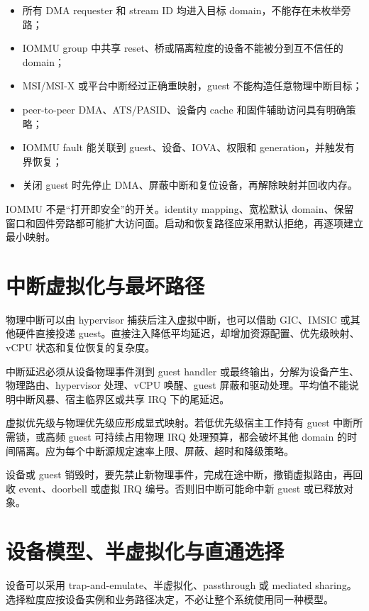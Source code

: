 \begin{itemize}
  \item 所有 DMA requester 和 stream ID 均进入目标 domain，不能存在未枚举旁路；
  \item IOMMU group 中共享 reset、桥或隔离粒度的设备不能被分到互不信任的 domain；
  \item MSI/MSI-X 或平台中断经过正确重映射，guest 不能构造任意物理中断目标；
  \item peer-to-peer DMA、ATS/PASID、设备内 cache 和固件辅助访问具有明确策略；
  \item IOMMU fault 能关联到 guest、设备、IOVA、权限和 generation，并触发有界恢复；
  \item 关闭 guest 时先停止 DMA、屏蔽中断和复位设备，再解除映射并回收内存。
\end{itemize}

IOMMU 不是“打开即安全”的开关。identity mapping、宽松默认 domain、保留窗口和固件旁路都可能扩大访问面。启动和恢复路径应采用默认拒绝，再逐项建立最小映射。

\section{中断虚拟化与最坏路径}

物理中断可以由 hypervisor 捕获后注入虚拟中断，也可以借助 GIC、IMSIC 或其他硬件直接投递 guest。直接注入降低平均延迟，却增加资源配置、优先级映射、vCPU 状态和复位恢复的复杂度。

中断延迟必须从设备物理事件测到 guest handler 或最终输出，分解为设备产生、物理路由、hypervisor 处理、vCPU 唤醒、guest 屏蔽和驱动处理。平均值不能说明中断风暴、宿主临界区或共享 IRQ 下的尾延迟。

虚拟优先级与物理优先级应形成显式映射。若低优先级宿主工作持有 guest 中断所需锁，或高频 guest 可持续占用物理 IRQ 处理预算，都会破坏其他 domain 的时间隔离。应为每个中断源规定速率上限、屏蔽、超时和降级策略。

设备或 guest 销毁时，要先禁止新物理事件，完成在途中断，撤销虚拟路由，再回收 event、doorbell 或虚拟 IRQ 编号。否则旧中断可能命中新 guest 或已释放对象。

\section{设备模型、半虚拟化与直通选择}

设备可以采用 trap-and-emulate、半虚拟化、passthrough 或 mediated sharing。选择粒度应按设备实例和业务路径决定，不必让整个系统使用同一种模型。

